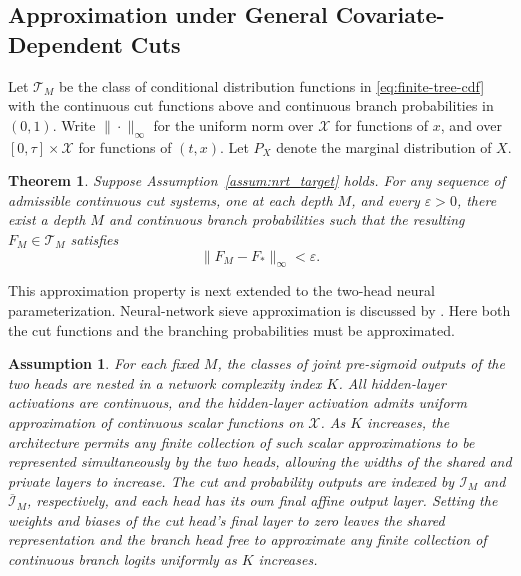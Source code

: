 \documentclass[11pt]{article}
\numberwithin{equation}{section}
\newtheorem{myTheo}{Theorem}
\newtheorem{assum}{Assumption}
\begin{document}
\subsection{Approximation under General Covariate-Dependent Cuts}

Let $\mathcal T_M$ be the class of conditional distribution functions in \eqref{eq:finite-tree-cdf} with the continuous cut functions above and continuous branch probabilities in $(0,1)$. Write $\|\cdot\|_\infty$ for the uniform norm over $\mathcal X$ for functions of $x$, and over $[0,\tau]\times\mathcal X$ for functions of $(t,x)$. Let $P_X$ denote the marginal distribution of $X$.

\begin{myTheo}
\label{thm:rt_full_support}
Suppose Assumption~\ref{assum:nrt_target} holds. For any sequence of admissible continuous cut systems, one at each depth $M$, and every $\varepsilon>0$, there exist a depth $M$ and continuous branch probabilities such that the resulting $F_M\in\mathcal T_M$ satisfies
\begin{equation}
    \|F_M-F_*\|_\infty<\varepsilon.
    \label{eq:rt_uniform_approximation}
\end{equation}
\end{myTheo}

This approximation property is next extended to the two-head neural parameterization. Neural-network sieve approximation is discussed by \citet{shen_asymptotic_2023}. Here both the cut functions and the branching probabilities must be approximated.

\begin{assum}
\label{assum:nrt_network_richness}
For each fixed $M$, the classes of joint pre-sigmoid outputs of the two heads are nested in a network complexity index $K$. All hidden-layer activations are continuous, and the hidden-layer activation admits uniform approximation of continuous scalar functions on $\mathcal X$. As $K$ increases, the architecture permits any finite collection of such scalar approximations to be represented simultaneously by the two heads, allowing the widths of the shared and private layers to increase. The cut and probability outputs are indexed by $\mathcal I_M$ and $\overline{\mathcal I}_M$, respectively, and each head has its own final affine output layer. Setting the weights and biases of the cut head's final layer to zero leaves the shared representation and the branch head free to approximate any finite collection of continuous branch logits uniformly as $K$ increases.
\end{assum}
\end{document}
